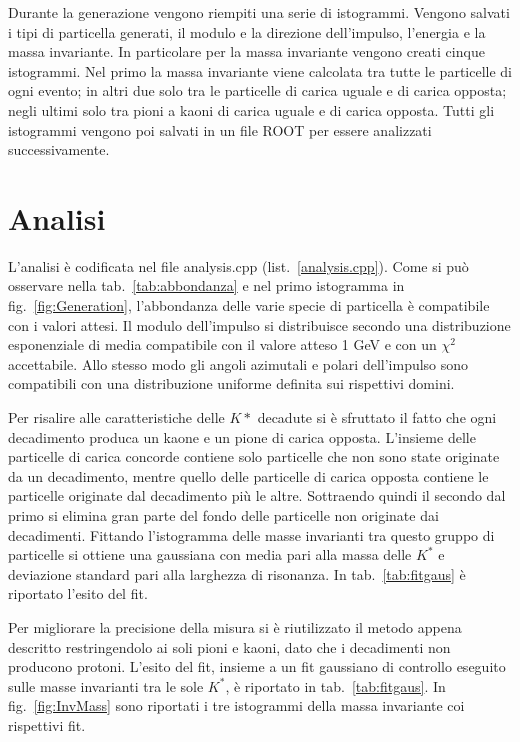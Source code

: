 \documentclass[a4paper,10pt]{article}
\begin{document}
Durante la generazione vengono riempiti una serie di istogrammi. Vengono salvati i tipi di particella generati, il modulo e la direzione dell'impulso, l'energia e la massa invariante. In particolare per la massa invariante vengono creati cinque istogrammi. Nel primo la massa invariante viene calcolata tra tutte le particelle di ogni evento; in altri due solo tra le particelle di carica uguale e di carica opposta; negli ultimi solo tra pioni a kaoni di carica uguale e di carica opposta. Tutti gli istogrammi vengono poi salvati in un file ROOT per essere analizzati successivamente.

\section{Analisi}
L'analisi è codificata nel file analysis.cpp (list.~\ref{analysis.cpp}). Come si può osservare nella tab.~\ref{tab:abbondanza} e nel primo istogramma in fig.~\ref{fig:Generation}, l'abbondanza delle varie specie di particella è compatibile con i valori attesi. Il modulo dell'impulso si distribuisce secondo una distribuzione esponenziale di media compatibile con il valore atteso 1 GeV e con un $\chi^2$ accettabile. Allo stesso modo gli angoli azimutali e polari dell'impulso sono compatibili con una distribuzione uniforme definita sui rispettivi domini.

Per risalire alle caratteristiche delle $K*$ decadute si è sfruttato il fatto che ogni decadimento produca un kaone e un pione di carica opposta. L'insieme delle particelle di carica concorde contiene solo particelle che non sono state originate da un decadimento, mentre quello delle particelle di carica opposta contiene le particelle originate dal decadimento più le altre. Sottraendo quindi il secondo dal primo si elimina gran parte del fondo delle particelle non originate dai decadimenti. Fittando l'istogramma delle masse invarianti tra questo gruppo di particelle si ottiene una gaussiana con media pari alla massa delle $K^*$ e deviazione standard pari alla larghezza di risonanza. In tab.~\ref{tab:fitgaus} è riportato l'esito del fit.

Per migliorare la precisione della misura si è riutilizzato il metodo appena descritto restringendolo ai soli pioni e kaoni, dato che i decadimenti non producono protoni. L'esito del fit, insieme a un fit gaussiano di controllo eseguito sulle masse invarianti tra le sole $K^*$, è riportato in tab.~\ref*{tab:fitgaus}. In fig.~\ref*{fig:InvMass} sono riportati i tre istogrammi della massa invariante coi rispettivi fit.
\end{document}
